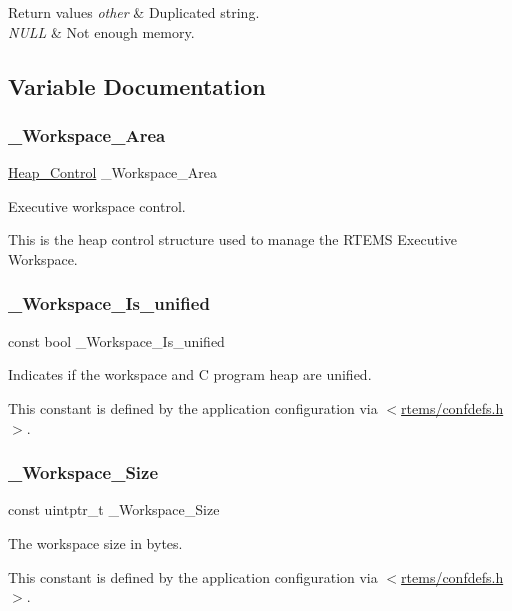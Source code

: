 \begin{DoxyRetVals}{Return values}
{\em other} & Duplicated string. \\
\hline
{\em N\+U\+LL} & Not enough memory. \\
\hline
\end{DoxyRetVals}


\subsection{Variable Documentation}
\mbox{\label{group__RTEMSScoreWorkspace_gafe1ea31ce9287b6d4aff796ea3e4072d}} 
\subsubsection{\texorpdfstring{\_Workspace\_Area}{\_Workspace\_Area}}
{\footnotesize\ttfamily \mbox{\hyperlink{structHeap__Control}{Heap\+\_\+\+Control}} \+\_\+\+Workspace\+\_\+\+Area}



Executive workspace control. 

This is the heap control structure used to manage the R\+T\+E\+MS Executive Workspace. \mbox{\label{group__RTEMSScoreWorkspace_ga84b72a03c4cdbd5239ff69fef4731406}} 
\subsubsection{\texorpdfstring{\_Workspace\_Is\_unified}{\_Workspace\_Is\_unified}}
{\footnotesize\ttfamily const bool \+\_\+\+Workspace\+\_\+\+Is\+\_\+unified}



Indicates if the workspace and C program heap are unified. 

This constant is defined by the application configuration via $<$\mbox{\hyperlink{confdefs_8h}{rtems/confdefs.\+h}}$>$. \mbox{\label{group__RTEMSScoreWorkspace_gae5131dff6dba6c4bd266d2da11aacf93}} 
\subsubsection{\texorpdfstring{\_Workspace\_Size}{\_Workspace\_Size}}
{\footnotesize\ttfamily const uintptr\+\_\+t \+\_\+\+Workspace\+\_\+\+Size}



The workspace size in bytes. 

This constant is defined by the application configuration via $<$\mbox{\hyperlink{confdefs_8h}{rtems/confdefs.\+h}}$>$. 